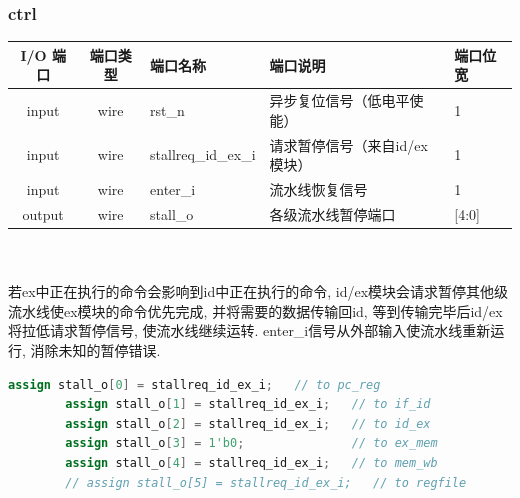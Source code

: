 \documentclass[lang=cn,11pt,a4paper,chinesefont=founder]{elegantpaper}
\begin{document}
\subsubsection{ctrl}
\begin{tabular}{cclll}
    \toprule
    I/O 端口 & 端口类型 & 端口名称            & 端口说明                      & 端口位宽 \\
    \midrule
    input    & wire     & rst\_n              & 异步复位信号（低电平使能）    & 1        \\
    input    & wire     & stallreq\_id\_ex\_i & 请求暂停信号（来自id/ex模块） & 1        \\
    input    & wire     & enter\_i            & 流水线恢复信号                & 1        \\
    output   & wire     & stall\_o            & 各级流水线暂停端口            & [4:0]    \\
    \bottomrule
\end{tabular}\\
\\若ex中正在执行的命令会影响到id中正在执行的命令, id/ex模块会请求暂停其他级流水线使ex模块的命令优先完成, 并将需要的数据传输回id, 等到传输完毕后id/ex将拉低请求暂停信号, 使流水线继续运转. enter\_i信号从外部输入使流水线重新运行, 消除未知的暂停错误. 
\begin{lstlisting}[language=verilog]
		assign stall_o[0] = stallreq_id_ex_i;   // to pc_reg
		assign stall_o[1] = stallreq_id_ex_i;   // to if_id
		assign stall_o[2] = stallreq_id_ex_i;   // to id_ex
		assign stall_o[3] = 1'b0;               // to ex_mem
		assign stall_o[4] = stallreq_id_ex_i;   // to mem_wb
		// assign stall_o[5] = stallreq_id_ex_i;   // to regfile
	\end{lstlisting}
\end{document}
